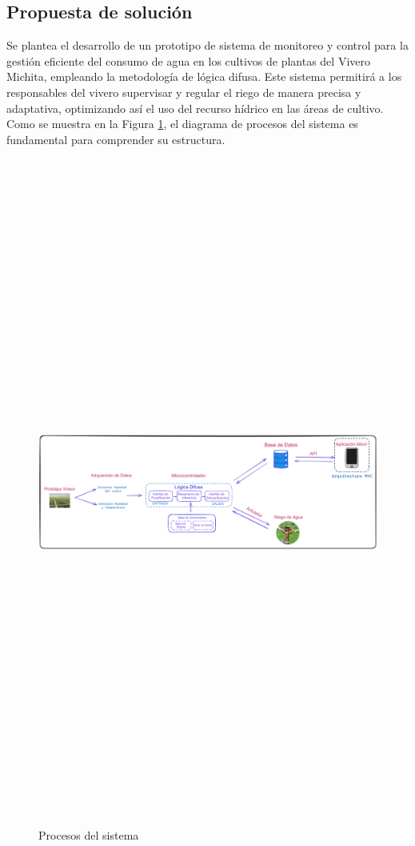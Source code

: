 \subsection{Propuesta de solución}
Se plantea el desarrollo de un prototipo de sistema de monitoreo y control para
la gestión eficiente del consumo de agua en los cultivos de plantas del Vivero
Michita, empleando la metodología de lógica difusa. Este sistema permitirá a
los responsables del vivero supervisar y regular el riego de manera precisa y
adaptativa, optimizando así el uso del recurso hídrico en las áreas de cultivo.
Como se muestra en la Figura \ref{fig:esquema_riego}, el diagrama de procesos
del sistema es fundamental para comprender su estructura. 
\bigbreak 
\bigbreak 
\bigbreak 

\begin{figure}[h]
    \centering
    \includegraphics[width=14cm,height=22cm,keepaspectratio]{resources/images/ESQUEMA1.png}
    \caption{Procesos del sistema}
    \label{fig:esquema_riego}
\end{figure}

